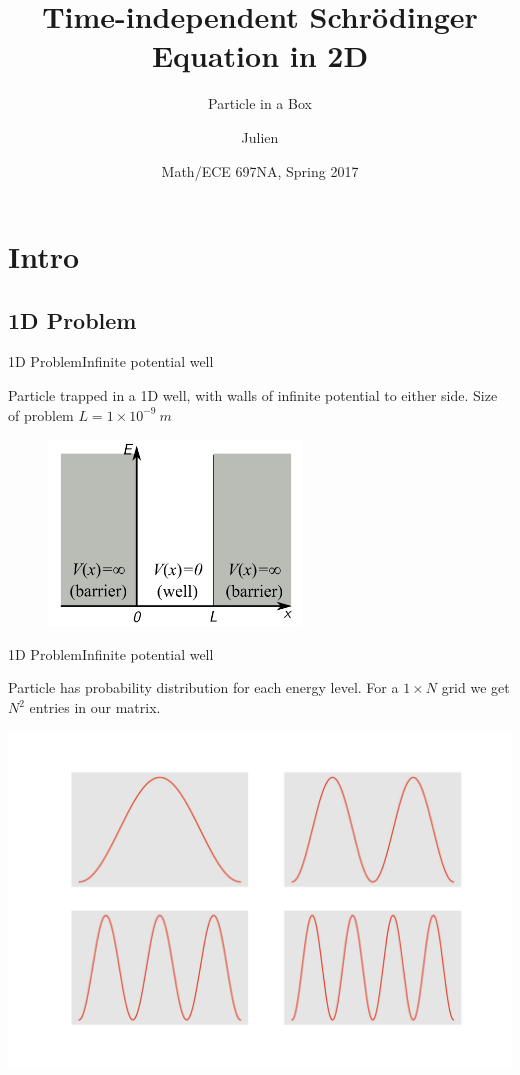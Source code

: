 \documentclass[mathserif]{beamer}
\title{Time-independent Schrödinger Equation in 2D}
\subtitle{Particle in a Box}
\author{Julien}
\date{Math/ECE 697NA, Spring 2017}
\begin{document}
\begin{frame}
 \titlepage{}
\end{frame}

\section{Intro}

\subsection{1D Problem}

\begin{frame}{1D Problem}{Infinite potential well}

 Particle trapped in a 1D well, with walls of infinite potential to either side.
 Size of problem \(L=1 \times 10^{-9} \ m \)

 \begin{figure}
  \centering
  \includegraphics[width=0.6\textwidth]{images/1d.png}
 \end{figure}

\end{frame}

\begin{frame}{1D Problem}{Infinite potential well}

 Particle has probability distribution for each energy level.
 For a \(1 \times N \) grid we get \(N^2 \) entries in our matrix.

 \centering
 \includegraphics[scale=0.4]{images/1dp.pdf}


\end{frame}
\end{document}
